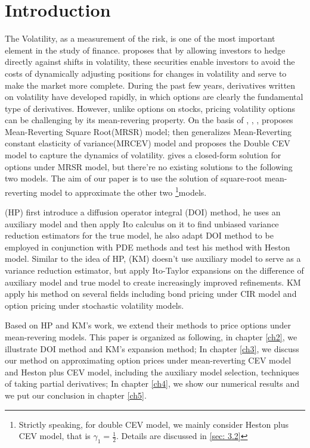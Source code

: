 \chapter{Introduction}

The Volatility, as a measurement of the risk, is one of the most important element in the study of finance. \cite{whaley_derivatives_1993} proposes that by allowing investors to hedge directly against shifts in volatility, these securities enable investors to avoid the costs of dynamically adjusting positions for changes in volatility and serve to make the market more complete. During the past few years, derivatives written on volatility have developed rapidly, in which options are clearly the fundamental type of derivatives. However, unlike options on stocks, pricing volatility options can be challenging by its mean-revering property. On the basis of \cite{cox_theory_1985}, \cite{hull_pricing_1987}, \cite{heston_closed-form_1993}, \cite{grunbichler_valuing_1996} proposes Mean-Reverting Square Root(MRSR) model; \cite{chan_empirical_1992} then generalizes Mean-Reverting constant elasticity of variance(MRCEV) model and \cite{gatheral_consistent_2008} proposes the Double CEV model to capture the dynamics of volatility. \cite{grunbichler_valuing_1996} gives a closed-form solution for options under MRSR model, but there're no existing solutions to the following two models. The aim of our paper is to use the solution of square-root mean-reverting model to approximate the other two \footnote{Strictly speaking, for double CEV model, we mainly consider Heston plus CEV model, that is $\gamma_1=\frac{1}{2}$. Details are discussed in \ref{sec: 3.2}}{models}.

\cite{heath_variance_2002}(HP) first introduce a diffusion operator integral (DOI) method, he uses an auxiliary model and then apply Ito calculus on it to find unbiased variance reduction estimators for the true model, he also adapt DOI method to be employed in conjunction with PDE methods and test his method with Heston model. Similar to the idea of HP, \cite{kristensen_adding_2011}(KM) doesn't use auxiliary model to serve as a variance reduction estimator, but apply Ito-Taylor expansions on the difference of auxiliary model and true model to  create increasingly improved refinements. KM apply his method on several fields including bond pricing under CIR model and option pricing under stochastic volatility models.

Based on HP and KM's work, we extend their methods to price options under mean-revering models. This paper is organized as following, in chapter \ref{ch2}, we illustrate DOI method and KM's expansion method; In chapter \ref{ch3}, we discuss our method on approximating option prices under mean-reverting CEV model and Heston plus CEV model, including the auxiliary model selection, techniques of taking partial derivatives; In chapter \ref{ch4}, we show our numerical results and we put our conclusion in chapter \ref{ch5}.
